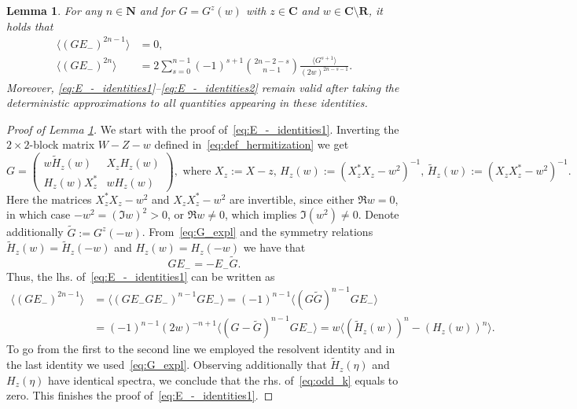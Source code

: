 \documentclass[10pt,a4paper]{amsart}
\newtheorem{lemma}{Lemma}
\newcommand{\C}{\mathbf{C}}
\newcommand{\N}{\mathbf{N}}
\newcommand{\R}{\mathbf{R}}
\begin{document}
\begin{lemma}\label{lem:E_-}  For any $n\in\N$ and for $G=G^z(w)$ with $z\in\C$ and $w\in\C\setminus\R$, it holds that
\begin{align}
\langle (GE_-)^{2n-1}\rangle &= 0,\label{eq:E_-_identities1}\\
\langle (GE_-)^{2n}\rangle &= 2\sum_{s=0}^{n-1} (-1)^{s+1} \binom{2n-2-s}{n-1} \frac{\langle G^{s+1}\rangle}{(2w)^{2n-s-1}}. \label{eq:E_-_identities2}
\end{align}
Moreover, \eqref{eq:E_-_identities1}--\eqref{eq:E_-_identities2} remain valid after taking the deterministic approximations to all quantities appearing in these identities.
\end{lemma}

\begin{proof}[Proof of Lemma \ref{lem:E_-}] We start with the proof of~\eqref{eq:E_-_identities1}. Inverting the $2\times 2$-block matrix $W-Z-w$ defined in~\eqref{eq:def_hermitization} we get
\begin{equation}
G\!=\!\begin{pmatrix}
w \widetilde{H}_z(w)& X_z H_z(w)\\ H_z(w)X_z^*& w H_z(w)
\end{pmatrix}\!\!,\,\, \text{where}\,\, X_z\!:=X-z,\,
H_z(w)\!:=\! (X_z^*X_z-w^2)^{-1}\!\!,\, \widetilde{H}_z(w)\!:=\! (X_zX_z^*-w^2)^{-1}\!\!.
\label{eq:G_expl}
\end{equation}
Here the matrices $X_z^*X_z-w^2$ and $X_zX_z^*-w^2$ are invertible, since either $\Re w=0$, in which case $-w^2=(\Im w)^2>0$, or $\Re w\neq 0$, which implies $\Im (w^2)\neq 0$. Denote additionally $\widetilde{G}:=G^z(-w)$. From~\eqref{eq:G_expl} and the symmetry relations $\widetilde{H}_z(w)=\widetilde{H}_z(-w)$ and $H_z(w)=H_z(-w)$ we have that
\begin{equation}
GE_-=-E_-\widetilde{G}.
\label{eq:GE}
\end{equation}
Thus, the lhs. of~\eqref{eq:E_-_identities1} can be written as
\begin{equation}
\begin{split}
\langle (GE_-)^{2n-1}\rangle &= \langle (GE_-GE_-)^{n-1} GE_-\rangle = (-1)^{n-1} \langle (G\widetilde{G})^{n-1} GE_-\rangle\\
& = (-1)^{n-1} (2w)^{-n+1}\langle (G-\widetilde{G})^{n-1} GE_-\rangle=w\langle (\widetilde{H}_z(w))^{n}-(H_z(w))^{n}\rangle.
\end{split}
\label{eq:odd_k}
\end{equation}
To go from the first to the second line we employed the resolvent identity and in the last identity we used~\eqref{eq:G_expl}. Observing additionally that $\widetilde{H}_z(\eta)$ and $H_z(\eta)$ have identical spectra, we conclude that the rhs. of~\eqref{eq:odd_k} equals to zero. This finishes the proof of~\eqref{eq:E_-_identities1}.


\end{proof}
\end{document}
